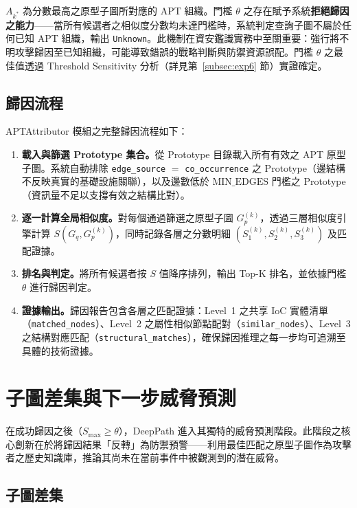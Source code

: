\begin{ZhChapter}
$A_{k^*}$ 為分數最高之原型子圖所對應的 APT 組織。門檻 $\theta$ 之存在賦予系統\textbf{拒絕歸因之能力}——當所有候選者之相似度分數均未達門檻時，系統判定查詢子圖不屬於任何已知 APT 組織，輸出 \texttt{Unknown}。此機制在資安鑑識實務中至關重要：強行將不明攻擊歸因至已知組織，可能導致錯誤的戰略判斷與防禦資源誤配。門檻 $\theta$ 之最佳值透過 Threshold Sensitivity 分析（詳見第~\ref{subsec:exp6} 節）實證確定。

\subsection{歸因流程}
\label{subsec:attribution-flow}

APTAttributor 模組之完整歸因流程如下：

\begin{enumerate}
    \item \textbf{載入與篩選 Prototype 集合。}從 Prototype 目錄載入所有有效之 APT 原型子圖。系統自動排除 \texttt{edge\_source} $=$ \texttt{co\_occurrence} 之 Prototype（邊結構不反映真實的基礎設施關聯），以及邊數低於 $\text{MIN\_EDGES}$ 門檻之 Prototype（資訊量不足以支撐有效之結構比對）。
    \item \textbf{逐一計算全局相似度。}對每個通過篩選之原型子圖 $G_p^{(k)}$，透過三層相似度引擎計算 $S(G_q, G_p^{(k)})$，同時記錄各層之分數明細 $(S_1^{(k)}, S_2^{(k)}, S_3^{(k)})$ 及匹配證據。
    \item \textbf{排名與判定。}將所有候選者按 $S$ 值降序排列，輸出 Top-K 排名，並依據門檻 $\theta$ 進行歸因判定。
    \item \textbf{證據輸出。}歸因報告包含各層之匹配證據：Level~1 之共享 IoC 實體清單（\texttt{matched\_nodes}）、Level~2 之屬性相似節點配對（\texttt{similar\_nodes}）、Level~3 之結構對應匹配（\texttt{structural\_matches}），確保歸因推理之每一步均可追溯至具體的技術證據。
\end{enumerate}


\section{子圖差集與下一步威脅預測}
\label{sec:threat-prediction}

在成功歸因之後（$S_{\max} \geq \theta$），DeepPath 進入其獨特的威脅預測階段。此階段之核心創新在於將歸因結果「反轉」為防禦預警——利用最佳匹配之原型子圖作為攻擊者之歷史知識庫，推論其尚未在當前事件中被觀測到的潛在威脅。

\subsection{子圖差集}
\label{subsec:subgraph-diff}


\end{ZhChapter}
